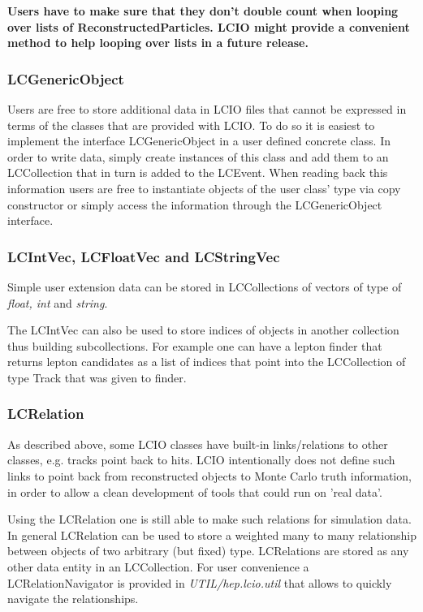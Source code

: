 \documentclass[twoside]{article}
\begin{document}
{\bf Users have to make sure that they don't double count when looping over lists of ReconstructedParticles. 
LCIO might provide a convenient method to help looping over lists in a future release.}

\subsubsection{LCGenericObject}
Users are free to store additional data in LCIO files that cannot be expressed in terms of the classes that 
are provided with LCIO. To do so it is easiest to implement the interface LCGenericObject in a user defined
concrete class. In order to write data, simply create instances of this class and add them to an LCCollection
that in turn is added to the LCEvent. When reading back this information users are free to instantiate 
objects of the user class' type via copy constructor or simply access the information through the LCGenericObject
interface.

\subsubsection{LCIntVec, LCFloatVec and LCStringVec}
Simple user extension data can be stored in LCCollections of vectors of type of {\em float, int} and {\em string}. 

The LCIntVec can also be used to store indices of objects in another collection thus building
subcollections. For example one can have a lepton finder that returns lepton candidates as a list of 
indices that point into the LCCollection of type Track that was given to finder.

\subsubsection{LCRelation}
As described above, some LCIO classes have built-in links/relations to other classes, e.g. tracks point back to 
hits. LCIO intentionally does not define such links to point back from reconstructed objects to Monte Carlo truth 
information, in order to allow a clean development of tools that could run on 'real data'.

Using the LCRelation one is still able to make such relations for simulation data. In general LCRelation can be
used to store a weighted many to many relationship between objects of two arbitrary (but fixed) type.
LCRelations are stored as any other data entity in an LCCollection. For user convenience a LCRelationNavigator
is provided in {\it UTIL/hep.lcio.util} that allows to quickly navigate the relationships.
\end{document}
